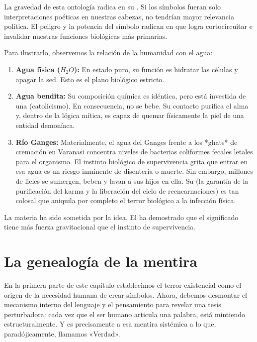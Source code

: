 La gravedad de esta ontología radica en su \textbf{\EficaciaSimbolica}. Si los símbolos fueran solo interpretaciones poéticas en nuestras cabezas, no tendrían mayor relevancia política. El peligro y la potencia del símbolo radican en que logra cortocircuitar e invalidar nuestras funciones biológicas más primarias.

Para ilustrarlo, observemos la relación de la humanidad con el agua:
\begin{enumerate}
    \item \textbf{Agua física ($H_2O$):} En estado puro, su función es hidratar las células y apagar la sed. Esto es el plano biológico estricto.
    \item \textbf{Agua bendita:} Su composición química es idéntica, pero está investida de una \FormaSimbolica{} (catolicismo). En consecuencia, no se bebe. Su contacto purifica el alma y, dentro de la lógica mítica, es capaz de quemar físicamente la piel de una entidad demoníaca.
    \item \textbf{Río Ganges:} Materialmente, el agua del Ganges frente a los *ghats* de cremación en Varanasi concentra niveles de bacterias coliformes fecales letales para el organismo. El instinto biológico de supervivencia grita que entrar en esa agua es un riesgo inminente de disentería o muerte. Sin embargo, millones de fieles se sumergen, beben y lavan a sus hijos en ella. Su \EficaciaSimbolica{} (la garantía de la purificación del karma y la liberación del ciclo de reencarnaciones) es tan colosal que aniquila por completo el terror biológico a la infección física. 
\end{enumerate}

La materia ha sido sometida por la idea. El \AnimalSimbolico{} ha demostrado que el significado tiene más fuerza gravitacional que el instinto de supervivencia.

\section{La genealogía de la mentira}

En la primera parte de este capítulo establecimos el terror existencial como el origen de la necesidad humana de crear símbolos. Ahora, debemos desmontar el mecanismo interno del lenguaje y el pensamiento para revelar una tesis perturbadora: cada vez que el ser humano articula una palabra, está mintiendo estructuralmente. Y es precisamente a esa mentira sistémica a lo que, paradójicamente, llamamos «Verdad».

